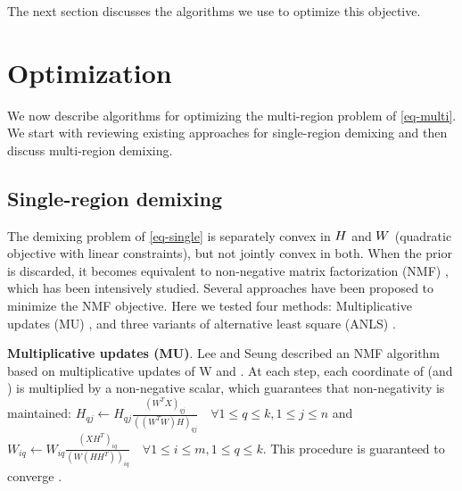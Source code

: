 The next section discusses the algorithms we use to optimize this objective.

\section{Optimization}
We now describe algorithms for optimizing the multi-region problem of \eqref{eq-multi}. We start with reviewing existing approaches for single-region demixing and then discuss multi-region demixing. 



\subsection{Single-region demixing}
The demixing problem of \eqref{eq-single} is separately convex in ${H}$ and $W$ (quadratic objective with linear constraints), but not jointly convex in both. When the prior is discarded, it becomes equivalent to non-negative matrix factorization (NMF) \cite{leenmfs}, which has been intensively studied. Several approaches have been proposed to minimize the NMF objective.
%
Here we tested four methods: Multiplicative updates (MU) \cite{leenmfs}, and three variants of alternative least square (ANLS) \cite{lin2007projected,kim2008activeset,kim2011fast}. 

{\bf {Multiplicative updates (MU)}}. Lee and Seung \cite{leenmfs} described an NMF algorithm based on multiplicative updates of W and \Htext. At each step, each coordinate of \Htext (and \W) is multiplied by a non-negative scalar, which guarantees that non-negativity is maintained: $H_{qj} \leftarrow H_{qj} \frac{(W^TX)_{qj}}{((W^TW)H)_{qj}} \quad
\forall 1\leq q \leq k, 1\leq j \leq n$ and $W_{iq} \leftarrow W_{iq} \frac{(XH^T)_{iq}}{(W(HH^T))_{iq}} \quad \forall 1\leq i \leq m, 1\leq q \leq k$.
This procedure is guaranteed to converge \cite{leenmfs,lin2007convergence}. 

